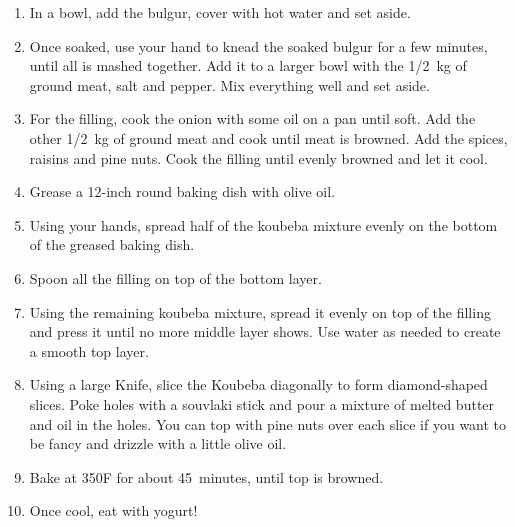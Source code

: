 \begin{enumerate}
    \item In a bowl, add the bulgur, cover with hot water and set aside.
    \item Once soaked, use your hand to knead the soaked bulgur for a few minutes, until all is mashed together. Add it to a larger bowl with the 1/2~kg of ground meat, salt and pepper. Mix everything well and set aside.
    \item For the filling, cook the onion with some oil on a pan until soft. Add the other 1/2~kg of ground meat and cook until meat is browned. Add the spices, raisins and pine nuts. Cook the filling until evenly browned and let it cool.
    \item Grease a 12-inch round baking dish with olive oil.
    \item Using your hands, spread half of the koubeba mixture evenly on the bottom of the greased baking dish.
    \item Spoon all the filling on top of the bottom layer.
    \item Using the remaining koubeba mixture, spread it evenly on top of the filling and press it until no more middle layer shows. Use water as needed to create a smooth top layer.
    \item Using a large Knife, slice the Koubeba diagonally to form diamond-shaped slices. Poke holes with a souvlaki stick and pour a mixture of melted butter and oil in the holes. You can top with pine nuts over each slice if you want to be fancy and drizzle with a little olive oil.
    \item Bake at 350\degree F for about 45~minutes, until top is browned.
    \item Once cool, eat with yogurt!
\end{enumerate}

